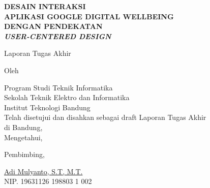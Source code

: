 \clearpage
\pagestyle{empty}

\begin{center}
    \smallskip

    \Large \bfseries \MakeUppercase{Desain Interaksi} \\
    \Large \bfseries \MakeUppercase{Aplikasi Google Digital Wellbeing} \\
    \Large \bfseries \MakeUppercase{Dengan Pendekatan} \\
    \Large \bfseries \MakeUppercase{\textit{User-Centered Design}}
    \vfill

    \Large Laporan Tugas Akhir
    \vfill

    \large Oleh

    \Large \theauthor

    \large Program Studi Teknik Informatika \\

    \normalsize \normalfont
    Sekolah Teknik Elektro dan Informatika \\
    Institut Teknologi Bandung \\

    \vfill
    \normalsize \normalfont
    Telah disetujui dan disahkan sebagai draft Laporan Tugas Akhir \\
    di Bandung, \thedate \\
    Mengetahui,

    \vspace{0.5cm}
    Pembimbing,

    \vfill
    \underline{Adi Mulyanto, S.T, M.T.} \\
    NIP. 19631126 198803 1 002

\end{center}
\clearpage
